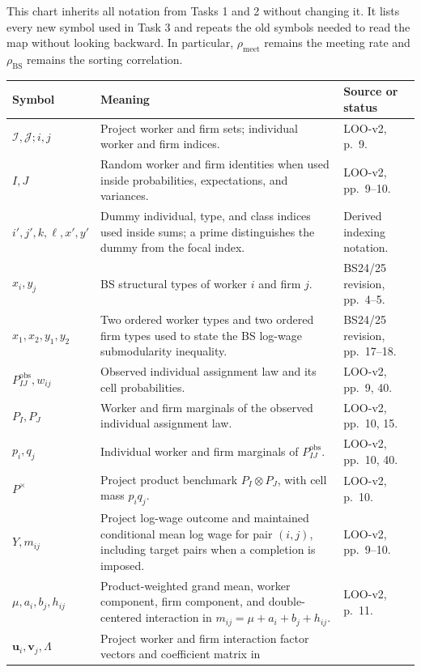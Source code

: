 \documentclass[11pt]{article}
\begin{document}
This chart inherits all notation from Tasks 1 and 2 without changing it.  It
lists every new symbol used in Task 3 and repeats the old symbols needed to
read the map without looking backward.  In particular,
\(\rho_{\mathrm{meet}}\) remains the meeting rate and
\(\rho_{\mathrm{BS}}\) remains the sorting correlation.

\begin{longtable}{p{}p{}p{}}
\textbf{Symbol} & \textbf{Meaning} & \textbf{Source or status} \\
\hline
\(\mathcal I,\mathcal J;i,j\) & Project worker and firm sets; individual
worker and firm indices. & LOO-v2, p.\ 9. \\
\(I,J\) & Random worker and firm identities when used inside probabilities,
expectations, and variances. & LOO-v2, pp.\ 9--10. \\
\(i',j',k,\ell,x',y'\) & Dummy individual, type, and class indices used
inside sums; a prime distinguishes the dummy from the focal index. & Derived
indexing notation. \\
\(x_i,y_j\) & BS structural types of worker \(i\) and firm \(j\). &
BS24/25 revision, pp.\ 4--5. \\
\(x_1,x_2,y_1,y_2\) & Two ordered worker types and two ordered firm types used
to state the BS log-wage submodularity inequality. & BS24/25 revision,
pp.\ 17--18. \\
\(P^{\mathrm{obs}}_{IJ},w_{ij}\) & Observed individual assignment law and
its cell probabilities. & LOO-v2, pp.\ 9, 40. \\
\(P_I,P_J\) & Worker and firm marginals of the observed individual assignment
law. & LOO-v2, pp.\ 10, 15. \\
\(p_i,q_j\) & Individual worker and firm marginals of
\(P^{\mathrm{obs}}_{IJ}\). & LOO-v2, pp.\ 10, 40. \\
\(P^\times\) & Project product benchmark
\(P_I\otimes P_J\), with cell mass \(p_iq_j\). & LOO-v2, p.\ 10. \\
\(Y,m_{ij}\) & Project log-wage outcome and maintained conditional mean log
wage for pair
\((i,j)\), including target pairs when a completion is imposed. & LOO-v2,
pp.\ 9--10. \\
\(\mu,a_i,b_j,h_{ij}\) & Product-weighted grand mean, worker component, firm
component, and double-centered interaction in
\(m_{ij}=\mu+a_i+b_j+h_{ij}\). & LOO-v2, p.\ 11. \\
\(\mathbf u_i,\mathbf v_j,\Lambda\) & Project worker and firm interaction
factor vectors and coefficient matrix in

\end{longtable}
\end{document}
